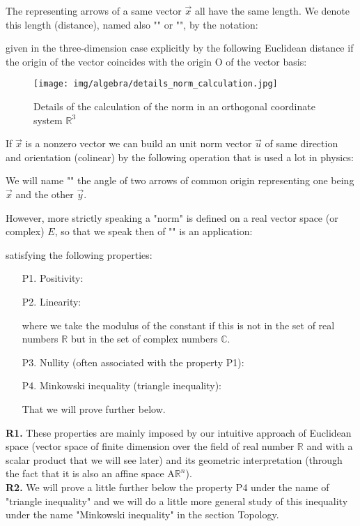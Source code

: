 	The representing arrows of a same vector $\vec{x}$ all have the same length. We denote this length (distance), named also "\label{vector norm}" or "", by the notation:
	
	given in the three-dimension case explicitly by the following Euclidean distance\label{euclidean distance vector} if the origin of the vector coincides with the origin O of the vector basis:
	
	\begin{figure}[H]
		\centering
		\texttt{[image: img/algebra/details\_norm\_calculation.jpg]}
		\caption{Details of the calculation of the norm in an orthogonal coordinate system $\mathbb{R}^3$}
	\end{figure}
	If $\vec{x}$ is a nonzero vector we can build an unit norm vector $\vec{u}$ of same direction and orientation (colinear) by the following operation that is used a lot in physics:
	
	We will name "" the angle of two arrows of common origin representing one being $\vec{x}$ and the other $\vec{y}$.
	
	However, more strictly speaking a "norm" is defined on a real vector space (or complex) $E$, so that we speak then of "" is an application:
	
	satisfying the following properties:
	\begin{enumerate}
		\item[P1.] Positivity:
		
		\item[P2.] Linearity:
		
		where we take the modulus of the constant if this is not in the set of real numbers $\mathbb{R}$ but in the set of complex numbers $\mathbb{C}$.
		\item[P3.] Nullity (often associated with the property P1):
		
		\item[P4.] Minkowski inequality (triangle inequality):
		
		That we will prove further below.
	\end{enumerate}
	\begin{tcolorbox}[title=Remark,colframe=black,arc=10pt]
	\textbf{R1.} These properties are mainly imposed by our intuitive approach of Euclidean space (vector space of finite dimension over the field of real number $\mathbb{R}$ and with a scalar product that we will see later) and its geometric interpretation (through the fact that it is also an affine space $\text{A}\mathbb{R}^n$).\\
	
	\textbf{R2.} We will prove a little further below the property P4 under the name of "triangle inequality" and we will do a little more general study of this inequality under the name "Minkowski inequality" in the section Topology.
	\end{tcolorbox}	
	
